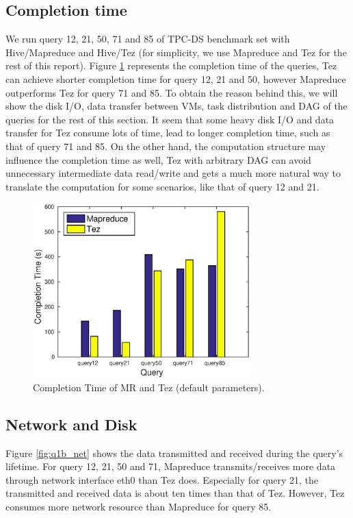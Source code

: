 \documentclass[10pt]{article}
\begin{document}
\subsection{Completion time}
We run query 12, 21, 50, 71 and 85 of TPC-DS benchmark set with Hive/Mapreduce and Hive/Tez (for simplicity, we use Mapreduce and Tez for the rest of this report). Figure \ref{fig:q1a_time} represents the completion time of the queries, Tez can achieve shorter completion time for query 12, 21 and 50, however Mapreduce outperforms Tez for query 71 and 85. To obtain the reason behind this, we will show the disk I/O, data transfer between VMs, task distribution and DAG of the queries for the rest of this section. It seem that some heavy disk I/O and data transfer for Tez consume lots of time, lead to longer completion time, such as that of query 71 and 85. On the other hand, the computation structure may influence the completion time as well, Tez with arbitrary DAG can avoid unnecessary intermediate data read/write and gets a much more natural way to translate the computation for some scenarios, like that of query 12 and 21.

\begin{figure}
\begin{center}
\includegraphics[width=0.75\textwidth]{pic/q1a_time}
\caption{Completion Time of MR and Tez (default parameters).}
\label{fig:q1a_time}
\end{center}
\end{figure}


\subsection{Network and Disk}
Figure \ref{fig:q1b_net} shows the data transmitted and received during the query's lifetime. For query 12, 21, 50 and 71, Mapreduce transmits/receives more data through network interface eth0 than Tez does. Especially for query 21, the transmitted and received data is about ten times than that of Tez. However, Tez consumes more network resource than Mapreduce for query 85.
\end{document}

